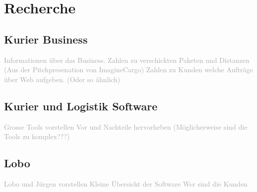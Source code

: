 \chapter{Recherche}
\label{sec:recherche}

\section{Kurier Business}
\textcolor{darkgray}{
  Informationen über das Business.
  Zahlen zu verschickten Paketen und Distanzen (Aus der Pitchpresenation von ImagineCargo)
  Zahlen zu Kunden welche Aufträge über Web aufgeben. (Oder so ähnlich)
}


\section{Kurier und Logistik Software}
\textcolor{darkgray}{
  Grosse Tools vorstellen
  Vor und Nachteile hervorheben
  (Möglicherweise sind die Tools zu komplex???)
}


\section{Lobo}
\textcolor{darkgray}{
  Lobo und Jürgen vorstellen
  Kleine Übersicht der Software
  Wer sind die Kunden
}